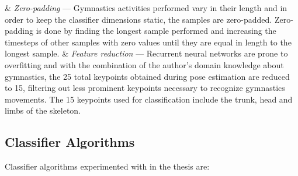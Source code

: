 \begin{easylist}[itemize]

& \textit{Zero-padding} --- Gymnastics activities performed vary in their length and in order to keep the classifier dimensions static, the samples are zero-padded. Zero-padding is done by finding the longest sample performed and increasing the timesteps of other samples with zero values until they are equal in length to the longest sample. 
& \textit{Feature reduction} --- Recurrent neural networks are prone to overfitting and with the combination of the author's domain knowledge about gymnastics, the 25 total keypoints obtained during pose estimation are reduced to 15, filtering out less prominent keypoints necessary to recognize gymnastics movements. The 15 keypoints used for classification include the trunk, head and limbs of the skeleton.

\end{easylist}


\subsection{Classifier Algorithms}

Classifier algorithms experimented with in the thesis are:


